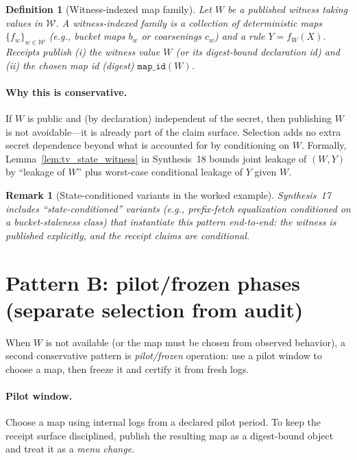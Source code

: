 \documentclass[11pt]{article}
\newtheorem{definition}{Definition}
\newtheorem{remark}{Remark}
\begin{document}
\begin{definition}[Witness-indexed map family]
Let $W$ be a published witness taking values in $\mathcal W$.
A \emph{witness-indexed family} is a collection of deterministic maps $\{f_w\}_{w\in\mathcal W}$
(e.g., bucket maps $b_w$ or coarsenings $c_w$) and a rule $Y=f_W(X)$.
Receipts publish (i) the witness value $W$ (or its digest-bound declaration id) and (ii) the chosen map id (digest) $\texttt{map\_id}(W)$.
\end{definition}

\paragraph{Why this is conservative.}
If $W$ is public and (by declaration) independent of the secret,
then publishing $W$ is not avoidable---it is already part of the claim surface.
Selection adds no extra secret dependence beyond what is accounted for by conditioning on $W$.
Formally, Lemma~\ref{lem:tv_state_witness} in Synthesis~18 bounds joint leakage of $(W,Y)$ by
``leakage of $W$'' plus worst-case conditional leakage of $Y$ given $W$.\cite{series:planstate}

\begin{remark}[State-conditioned variants in the worked example]
Synthesis~17 includes ``state-conditioned'' variants (e.g., prefix-fetch equalization conditioned on a bucket-staleness class)
that instantiate this pattern end-to-end: the witness is published explicitly, and the receipt claims are conditional.\cite{series:workedexample}
\end{remark}

\section{Pattern B: pilot/frozen phases (separate selection from audit)}
When $W$ is not available (or the map must be chosen from observed behavior),
a second conservative pattern is \emph{pilot/frozen} operation:
use a pilot window to choose a map, then freeze it and certify it from fresh logs.

\paragraph{Pilot window.}
Choose a map using internal logs from a declared pilot period.
To keep the receipt surface disciplined, publish the resulting map as a digest-bound object and treat it as a \emph{menu change}.
\end{document}
